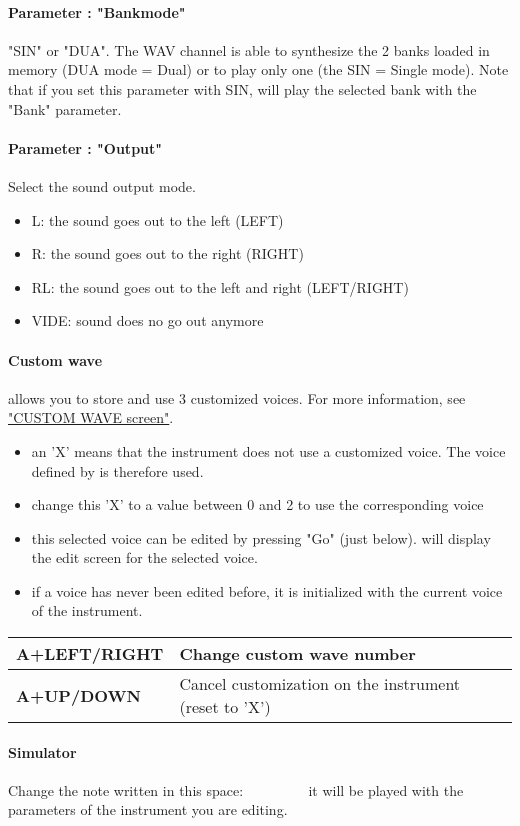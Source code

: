 \paragraph{Parameter : "Bankmode"} "SIN" or "DUA".
The WAV channel is able to synthesize the 2 banks loaded in memory (DUA mode = Dual) or to play only one (the SIN = Single mode).
Note that if you set this parameter with SIN, \FAT will play the selected bank with the "Bank" parameter.

\paragraph{Parameter : "Output"} Select the sound output mode.
\medskip

\begin{itemize}
    \item{L: the sound goes out to the left (LEFT)}
    \item{R: the sound goes out to the right (RIGHT)}
    \item{RL: the sound goes out to the left and right (LEFT/RIGHT)}
    \item{VIDE: sound does no go out anymore}
\end{itemize}

\paragraph{Custom wave} \FAT allows you to store and use 3 customized voices.
For more information, see \hyperref [subsec: customwave] {"CUSTOM WAVE screen"}.
\medskip

\begin{itemize}
  \item{an 'X' means that the instrument does not use a customized voice. The voice defined by \FAT is therefore used.}
  \item{change this 'X' to a value between 0 and 2 to use the corresponding voice}
  \item{this selected voice can be edited by pressing "Go" (just below). \FAT will display the edit screen for the selected voice.}
  \item{if a voice has never been edited before, it is initialized with the current voice of the instrument.}
\end{itemize}\medskip

\tablelasttail{\hline}
\begin{supertabular}{|l|p{11cm}|}
    \hline
    {\bf A+LEFT/RIGHT} & Change custom wave number \\
    \hline
    {\bf A+UP/DOWN} & Cancel customization on the instrument (reset to 'X') \\
\hline
\end{supertabular}
\medskip

\paragraph{Simulator} Change the note written in this space:
         it will be played with the parameters of the instrument you are editing.
